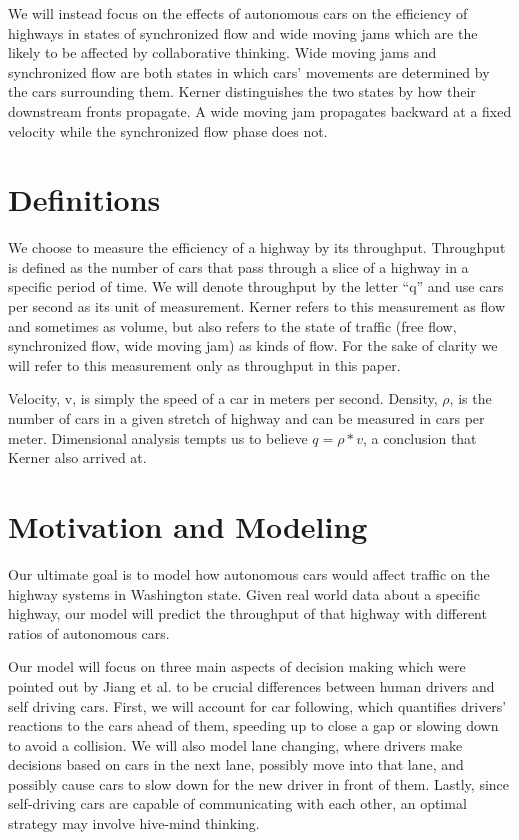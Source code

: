 We will instead focus on the effects of autonomous cars on the efficiency of highways in states of synchronized flow and wide moving jams which are the likely to be affected by collaborative thinking. Wide moving jams and synchronized flow are both states in which cars’ movements are determined by the cars surrounding them. Kerner distinguishes the two states by how their downstream fronts propagate. A wide moving jam propagates backward at a fixed velocity while the synchronized flow phase does not.

\section{Definitions}
We choose to measure the efficiency of a highway by its throughput. Throughput is defined as the number of cars that pass through a slice of a highway in a specific period of time. We will denote throughput by the letter “q” and use cars per second as its unit of measurement. Kerner refers to this measurement as flow and sometimes as volume, but also refers to the state of traffic (free flow, synchronized flow, wide moving jam) as kinds of flow. For the sake of clarity we will refer to this measurement only as throughput in this paper.

Velocity, v, is simply the speed of a car in meters per second. Density, $\rho$, is the number of cars in a given stretch of highway and can be measured in cars per meter. Dimensional analysis tempts us to believe $q = \rho * v$, a conclusion that Kerner also arrived at.

\section{Motivation and Modeling}

Our ultimate goal is to model how autonomous cars would affect traffic on the highway systems in Washington state. Given real world data about a specific highway, our model will predict the throughput of that highway with different ratios of autonomous cars.

Our model will focus on three main aspects of decision making which were pointed out by Jiang et al. to be crucial differences between human drivers and self driving cars. First, we will account for car following, which quantifies drivers’ reactions to the cars ahead of them, speeding up to close a gap or slowing down to avoid a collision. We will also model lane changing, where drivers make decisions based on cars in the next lane, possibly move into that lane, and possibly cause cars to slow down for the new driver in front of them. Lastly, since self-driving cars are capable of communicating with each other, an optimal strategy may involve hive-mind thinking.

